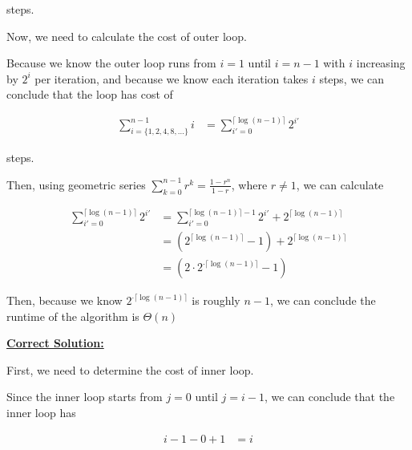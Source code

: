 \documentclass[12pt]{article}
\begin{document}
\begin{enumerate}[a.]
    steps.

    \bigskip

    Now, we need to calculate the cost of outer loop.

    \bigskip

    Because we know the outer loop runs from $i = 1$ until $i = n-1$ with $i$ increasing
    by $2^i$ per iteration, and because we know each iteration takes $i$ steps, we can
    conclude that the loop has cost of

    \begin{align}
        \sum\limits_{i= \{1,2,4,8,\dots\}}^{n-1} i &= \sum\limits_{i'=0}^{\lceil \log (n-1) \rceil} 2^{i'}
    \end{align}

    steps.

    \bigskip

    Then, using geometric series $\sum\limits_{k=0}^{n-1} r^k = \frac{1-r^n}{1-r}$, where $r \neq 1$, we can calculate

    \begin{align}
        \sum\limits_{i'=0}^{\lceil \log (n-1) \rceil} 2^{i'} &= \sum\limits_{i'=0}^{\lceil \log (n-1) \rceil - 1} 2^{i'} + 2^{\lceil \log (n-1) \rceil}\\
        &= (2^{\lceil \log(n-1) \rceil} - 1) + 2^{\lceil \log(n-1) \rceil}\\
        &= (2 \cdot 2^{\cdot \lceil \log(n-1) \rceil} - 1)
    \end{align}

    \bigskip

    Then, because we know $2^{\cdot \lceil \log(n-1) \rceil}$ is roughly $n-1$,
    we can conclude the runtime of the algorithm is $\Theta(n)$

    \bigskip

    \begin{mdframed}
        \underline{\textbf{Correct Solution:}}

        \bigskip

        First, we need to determine the cost of inner loop.

        \bigskip

        Since the inner loop starts from $j = 0$ until $j = i - 1$, we can conclude
        that the inner loop has

        \setcounter{equation}{0}
        \begin{align}
            i - 1 - 0 + 1 &= i
        \end{align}


\end{mdframed}
\end{enumerate}
\end{document}

